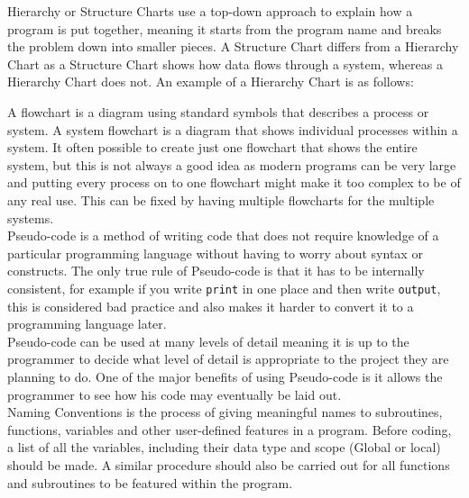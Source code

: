   \noindent
  Hierarchy or Structure Charts use a top-down approach to explain how a program is put together, meaning it starts from the program name and breaks the problem down into smaller pieces. A Structure Chart differs from a Hierarchy Chart as a Structure Chart shows how data flows through a system, whereas a Hierarchy Chart does not. An example of a Hierarchy Chart is as follows:
  \begin{figure}[H]
    \centering
  \end{figure}
  \noindent
  A flowchart is a diagram using standard symbols that describes a process or system. A system flowchart is a diagram that shows individual processes within a system. It often possible to create just one flowchart that shows the entire system, but this is not always a good idea as modern programs can be very large and putting every process on to one flowchart might make it too complex to be of any real use. This can be fixed by having multiple flowcharts for the multiple systems.\\
  Pseudo-code is a method of writing code that does not require knowledge of a particular programming language without having to worry about syntax or constructs. The only true rule of Pseudo-code is that it has to be internally consistent, for example if you write \verb|print| in one place and then write \verb|output|, this is considered bad practice and also makes it harder to convert it to a programming language later.\\
  Pseudo-code can be used at many levels of detail meaning it is up to the programmer to decide what level of detail is appropriate to the project they are planning to do. One of the major benefits of using Pseudo-code is it allows the programmer to see how his code may eventually be laid out.\\
  Naming Conventions is the process of giving meaningful names to subroutines, functions, variables and other user-defined features in a program. Before coding, a list of all the variables, including their data type and scope (Global or local) should be made. A similar procedure should also be carried out for all functions and subroutines to be featured within the program.\\
